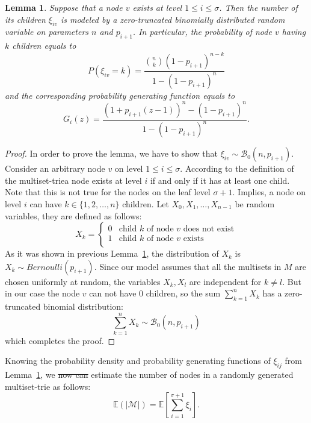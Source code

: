 \documentclass[10pt,letterpaper]{article}
\newtheorem{lemma}{Lemma}
\providecommand{\DIFaddtex}[1]{{\protect\color{blue}\uwave{#1}}} %
\providecommand{\DIFdeltex}[1]{{\protect\color{red}\sout{#1}}}                      %
\providecommand{\DIFaddbegin}{} %
\providecommand{\DIFaddend}{} %
\providecommand{\DIFdelbegin}{} %
\providecommand{\DIFdelend}{} %
\providecommand{\DIFadd}[1]{\texorpdfstring{\DIFaddtex{#1}}{#1}} %
\providecommand{\DIFdel}[1]{\texorpdfstring{\DIFdeltex{#1}}{}} %
\newcommand{\DIFscaledelfig}{0.5}
\newlength{\DIFdelgraphicswidth} %
\newlength{\DIFdelgraphicsheight} %
\newcommand{\DIFaddincludegraphics}[2][]{{\color{blue}\fbox{\DIFOincludegraphics[#1]{#2}}}} %
\newcommand{\DIFdelincludegraphics}[2][]{%
\sbox{\DIFdelgraphicsbox}{\DIFOincludegraphics[#1]{#2}}%
\settoboxwidth{\DIFdelgraphicswidth}{\DIFdelgraphicsbox} %
\settoboxtotalheight{\DIFdelgraphicsheight}{\DIFdelgraphicsbox} %
\scalebox{\DIFscaledelfig}{%
\parbox[b]{\DIFdelgraphicswidth}{\usebox{\DIFdelgraphicsbox}\\[-\baselineskip] \rule{\DIFdelgraphicswidth}{0em}}\llap{\resizebox{\DIFdelgraphicswidth}{\DIFdelgraphicsheight}{%
\setlength{\unitlength}{\DIFdelgraphicswidth}%
\begin{picture}(1,1)%
\thicklines\linethickness{2pt} %
{\color[rgb]{1,0,0}\put(0,0){\framebox(1,1){}}}%
{\color[rgb]{1,0,0}\put(0,0){\line( 1,1){1}}}%
{\color[rgb]{1,0,0}\put(0,1){\line(1,-1){1}}}%
\end{picture}%
}\hspace*{3pt}}} %
} %
\DeclareRobustCommand{\DIFaddbegin}{\DIFOaddbegin \let\includegraphics\DIFaddincludegraphics} %
\DeclareRobustCommand{\DIFaddend}{\DIFOaddend \let\includegraphics\DIFOincludegraphics} %
\DeclareRobustCommand{\DIFdelbegin}{\DIFOdelbegin \let\includegraphics\DIFdelincludegraphics} %
\DeclareRobustCommand{\DIFdelend}{\DIFOaddend \let\includegraphics\DIFOincludegraphics} %
\begin{document}
\begin{lemma}\label{l:prob-children}
Suppose that a node $v$ exists at level $1\leq i\leq\sigma$.
Then the number of its children $\xi_{iv}$ is modeled by a zero-truncated binomially
distributed random variable on parameters $n$ and $p_{i+1}$. In particular,
the probability of node $v$ having $k$ children equals to
\begin{equation}\label{eq:pdf}
P(\xi_{iv} = k) = \frac{\binom{n}{k} (1-p_{i+1})^{n-k}}{1-(1-p_{i+1})^n}
\end{equation}
and the corresponding probability generating function equals to
\begin{equation}\label{eq:generating_func}
G_i(z) = \frac{(1+p_{i+1}(z-1))^n - (1-p_{i+1})^n}{1-(1-p_{i+1})^n}.
\end{equation}
\end{lemma}
\begin{proof}
In order to prove the lemma, we have to show that
$\xi_{iv}\sim\mathcal{B}_0(n, p_{i+1}).$
Consider an arbitrary node $v$ on level $1\leq i\leq\sigma.$ According to the
definition of the multiset-trie\DIFaddbegin \DIFadd{, }\DIFaddend a node exists at level $i$ if and only if
it has at least one child. Note that this is not true for the nodes on the leaf
level $\sigma + 1.$ Implies, a node on level $i$ can have
$k\in\{ 1,2,\ldots, n\}$ children. Let $X_0, X_1, \ldots, X_{n-1}$ be random
variables, they are defined as follows:
\[
X_k = \begin{cases}
0 & \textrm{child $k$ of node $v$ does not exist} \\
1 & \textrm{child $k$ of node $v$ exists} \\
\end{cases}
\]
As it was shown in previous Lemma~\ref{l:prob-children}, the distribution of 
$X_k$ is $X_k\sim Bernoulli(p_{i+1}).$ Since our model assumes that all the 
multisets in $M$ are chosen uniformly at random, the variables 
$X_k,X_l$ are independent for $k\neq l.$ But in our case the node $v$ can not 
have 0 children, so the sum $\sum_{k=1}^n X_k$ has a zero-truncated binomial 
distribution:
%
\[
\sum_{k=1}^n X_k \sim\mathcal{B}_0(n,p_{i+1})
\]
%
which completes the proof.

\end{proof}
%
Knowing the probability density and probability generating functions of $\xi_{ij}$ 
from Lemma~\ref{l:prob-children}, we \DIFdelbegin \DIFdel{now can }\DIFdelend \DIFaddbegin \DIFadd{can now }\DIFaddend estimate the number of nodes in 
a randomly generated multiset-trie as follows:
%
\begin{equation}\label{eq:num_nodes}
\mathbb{E}( | \mathcal{M} | ) = \mathbb{E}\left[ \sum_{i=1}^{\sigma+1} \xi_i \right].
\end{equation}
%
\end{document}

